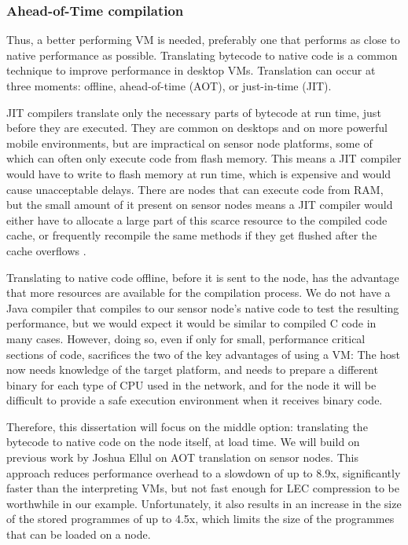 \subsubsection{Ahead-of-Time compilation}
Thus, a better performing VM is needed, preferably one that performs as close to native performance as possible. Translating bytecode to native code is a common technique to improve performance in desktop VMs. Translation can occur at three moments: offline, ahead-of-time (AOT), or just-in-time (JIT).

JIT compilers translate only the necessary parts of bytecode at run time, just before they are executed. They are common on desktops and on more powerful mobile environments, but are impractical on sensor node platforms, some of which can often only execute code from flash memory. This means a JIT compiler would have to write to flash memory at run time, which is expensive and would cause unacceptable delays. There are nodes that can execute code from RAM, but the small amount of it present on sensor nodes means a JIT compiler would either have to allocate a large part of this scarce resource to the compiled code cache, or frequently recompile the same methods if they get flushed after the cache overflows \cite{Ellul:2012thesis}.

Translating to native code offline, before it is sent to the node, has the advantage that more resources are available for the compilation process. We do not have a Java compiler that compiles to our sensor node's native code to test the resulting performance, but we would expect it would be similar to compiled C code in many cases. However, doing so, even if only for small, performance critical sections of code, sacrifices the two of the key advantages of using a VM: The host now needs knowledge of the target platform, and needs to prepare a different binary for each type of CPU used in the network, and for the node it will be difficult to provide a safe execution environment when it receives binary code.

Therefore, this dissertation will focus on the middle option: translating the bytecode to native code on the node itself, at load time. We will build on previous work by Joshua Ellul \cite{Ellul:2012thesis} on AOT translation on sensor nodes. This approach reduces performance overhead to a slowdown of up to 8.9x, significantly faster than the interpreting VMs, but not fast enough for LEC compression to be worthwhile in our example. Unfortunately, it also results in an increase in the size of the stored programmes of up to 4.5x, which limits the size of the programmes that can be loaded on a node.

